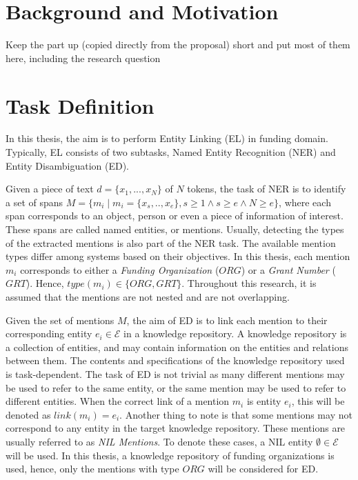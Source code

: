 \documentclass{report}
\theoremstyle{definition}
\theoremstyle{remark}
\begin{document}
\section{Background and Motivation}
Keep the part up (copied directly from the proposal) short and put most of them here, including the research question

\newpage
\section{Task Definition}
In this thesis, the aim is to perform Entity Linking (EL) in funding domain. Typically, EL consists of two subtasks, Named Entity Recognition (NER) and Entity Disambiguation (ED).

Given a piece of text $d=\{x_1,...,x_N\}$ of $N$ tokens, the task of NER is to identify a set of spans $M = \{m_i \mid m_i = \{x_s,..,x_e\}, s \geq 1 \land s\geq e \land N \geq e\}$, where each span corresponds to an object, person or even a piece of information of interest. These spans are called named entities, or mentions. Usually, detecting the types of the extracted mentions is also part of the NER task. The available mention types differ among systems based on their objectives. In this thesis, each mention $m_i$ corresponds to either a \textit{Funding Organization} ($ORG$)  or a \textit{Grant Number} ($GRT$). Hence, $type(m_i) \in \{ORG,GRT\}$. Throughout this research, it is assumed that the mentions are not nested and are not overlapping.

Given the set of mentions $M$, the aim of ED is to link each mention to their corresponding entity $e_i \in \mathcal{E} $ in a knowledge repository. A knowledge repository is a collection of entities, and may contain information on the entities and relations between them. The contents and specifications of the knowledge repository used is task-dependent. The task of ED is not trivial as many different mentions may be used to refer to the same entity, or the same mention may be used to refer to different entities. When the correct link of a mention $m_i$ is entity $e_i$, this will be denoted as $link(m_i) = e_i $.  Another thing to note is that some mentions may not correspond to any entity in the target knowledge repository. These mentions are usually referred to as \textit{NIL Mentions}. To denote these cases, a NIL entity $\emptyset \in \mathcal{E}$ will be used. In this thesis, a knowledge repository of funding organizations is used, hence, only the mentions with type $ORG$ will be considered for ED.
\end{document}
